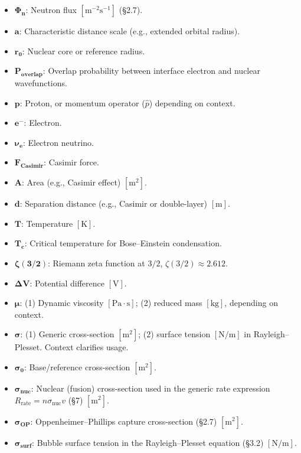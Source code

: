 \documentclass[11pt,a4paper]{article}
\begin{document}
\begin{itemize}
\item
  $\boldsymbol{\Phi_n}$: Neutron flux $[\text{m}^{-2}\text{s}^{-1}]$ (\S{}2.7).
\item
  $\boldsymbol{a}$: Characteristic distance scale (e.g., extended orbital radius).
\item
  $\boldsymbol{r_0}$: Nuclear core or reference radius.
\item
  $\boldsymbol{P_{\text{overlap}}}$: Overlap probability between interface electron and nuclear wavefunctions.
\item
  $\boldsymbol{p}$: Proton, or momentum operator ($\hat{p}$) depending on context.
\item
  $\boldsymbol{e^-}$: Electron.
\item
  $\boldsymbol{\nu_e}$: Electron neutrino.
\item
  $\boldsymbol{F_{\text{Casimir}}}$: Casimir force.
\item
  $\boldsymbol{A}$: Area (e.g., Casimir effect) $[\text{m}^2]$.
\item
  $\boldsymbol{d}$: Separation distance (e.g., Casimir or double-layer) $[\text{m}]$.
\item
  $\boldsymbol{T}$: Temperature $[\text{K}]$.
\item
  $\boldsymbol{T_c}$: Critical temperature for Bose--Einstein condensation.
\item
  $\boldsymbol{\zeta(3/2)}$: Riemann zeta function at $3/2$, $\zeta(3/2) \approx 2.612$.
\item
  $\boldsymbol{\Delta V}$: Potential difference $[\text{V}]$.
\item
  $\boldsymbol{\mu}$: (1) Dynamic viscosity $[\text{Pa}\cdot\text{s}]$; (2) reduced mass $[\text{kg}]$, depending on context.
\item
  $\boldsymbol{\sigma}$: (1) Generic cross-section $[\text{m}^2]$; (2) surface tension $[\text{N/m}]$ in Rayleigh--Plesset. Context clarifies usage.
\item
  $\boldsymbol{\sigma_0}$: Base/reference cross-section $[\text{m}^2]$.
\item
  $\boldsymbol{\sigma_{\text{nuc}}}$: Nuclear (fusion) cross-section used in the generic rate expression $R_{\text{rate}} = n\sigma_{\text{nuc}}v$ (\S{}7) $[\text{m}^2]$.
\item
  $\boldsymbol{\sigma_{\text{OP}}}$: Oppenheimer--Phillips capture cross-section (\S{}2.7) $[\text{m}^2]$.
\item
  $\boldsymbol{\sigma_{\text{surf}}}$: Bubble surface tension in the Rayleigh--Plesset equation (\S{}3.2) $[\text{N/m}]$.

\end{itemize}
\end{document}
